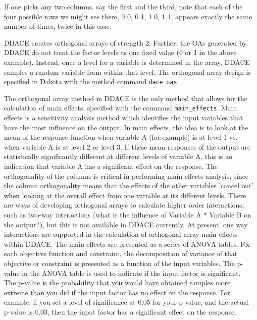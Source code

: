 If one picks any two columns, say the first and the third, note that 
each of the four possible rows we might see there,
0 0,       0 1,       1 0,       1 1,
appears exactly the same number of times, twice in this case.     

DDACE creates orthogonal arrays of strength 2.  Further, 
the OAs generated by DDACE do not treat the factor levels as one 
fixed value (0 or 1 in the above example).  Instead, once a level 
for a variable is determined in the array,  DDACE 
samples a random variable from within that level.
The orthogonal array design is specified in 
Dakota with the method command \texttt{dace oas}. 

The orthogonal array method in DDACE is the only method that 
allows for the calculation of main effects, specified with the 
command \texttt{main\_effects}.  Main effects is a sensitivity analysis 
method which identifies the input variables that have the most 
influence on the output.  In main effects, the idea is to look 
at the mean of the response function when variable A (for example) 
is at level 1 vs. when variable A is at level 2 or level 3.  
If these mean responses of the output are statistically significantly 
different at different levels of variable A, this is an indication that 
variable A has a significant effect on the response.  
The orthogonality of the columns is critical in performing 
main effects analysis, since the column orthogonality means 
that the effects of the other variables 'cancel out' when 
looking at the overall effect from one variable at its different 
levels.  There are ways of developing orthogonal arrays to calculate 
higher order interactions, such as two-way interactions (what 
is the influence of Variable A * Variable B on the output?), but this is 
not available in DDACE currently.  At present, one way interactions 
are supported in the calculation of orthogonal array main effects within DDACE.
The main effects are presented as a series of ANOVA tables. 
For each objective function and constraint, the decomposition of variance 
of that objective or constraint is presented as a function of the 
input variables.  The p-value in the ANOVA table is used to indicate 
if the input factor is significant.  The p-value is the probability that 
you would have obtained samples more extreme than you did if the input 
factor has no effect on the response.  For example, if you set a level 
of significance at 0.05 for your p-value, and the actual p-value is 0.03, 
then the input factor has a significant effect on the response. 

